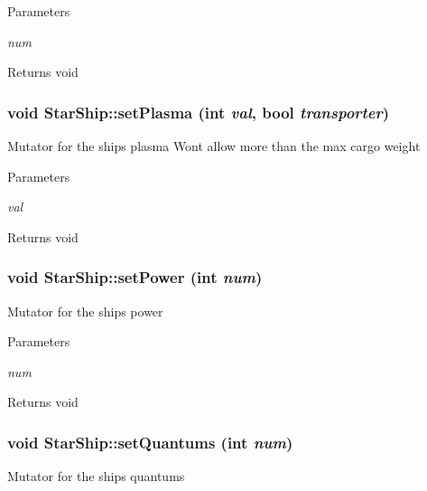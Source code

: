 \begin{DoxyParams}{Parameters}
\item[{\em num}]\end{DoxyParams}
\begin{DoxyReturn}{Returns}
void 
\end{DoxyReturn}
\hypertarget{classStarShip_afb3ed2798519853ab293432604e4fb0c}{
\subsubsection[{setPlasma}]{\setlength{\rightskip}{0pt plus 5cm}void StarShip::setPlasma (int {\em val}, \/  bool {\em transporter})}}
\label{da/d97/classStarShip_afb3ed2798519853ab293432604e4fb0c}
Mutator for the ships plasma Wont allow more than the max cargo weight


\begin{DoxyParams}{Parameters}
\item[{\em val}]\end{DoxyParams}
\begin{DoxyReturn}{Returns}
void 
\end{DoxyReturn}
\hypertarget{classStarShip_a3e690a6c422f5d863086536313d68bb9}{
\subsubsection[{setPower}]{\setlength{\rightskip}{0pt plus 5cm}void StarShip::setPower (int {\em num})}}
\label{da/d97/classStarShip_a3e690a6c422f5d863086536313d68bb9}
Mutator for the ships power


\begin{DoxyParams}{Parameters}
\item[{\em num}]\end{DoxyParams}
\begin{DoxyReturn}{Returns}
void 
\end{DoxyReturn}
\hypertarget{classStarShip_a54668a25efe99edc19892e3433008843}{
\subsubsection[{setQuantums}]{\setlength{\rightskip}{0pt plus 5cm}void StarShip::setQuantums (int {\em num})}}
\label{da/d97/classStarShip_a54668a25efe99edc19892e3433008843}
Mutator for the ships quantums


